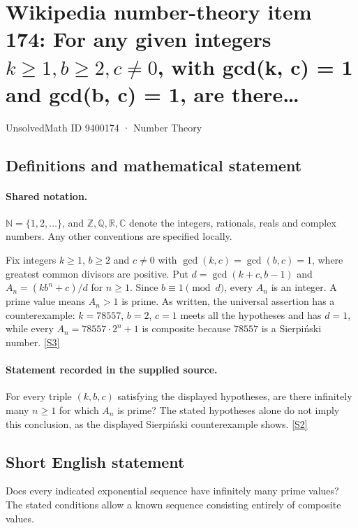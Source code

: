 \documentclass[11pt]{article}
\newcommand{\sref}[2]{\hyperlink{source:#1:#2}{[S#2]}}
\begin{document}
\setcounter{section}{9400173}
\section{\texorpdfstring{Wikipedia number-theory item 174: For any given integers $k\geq 1, b\geq 2, c\neq 0$, with gcd(k, c) = 1 and gcd(b, c) = 1, are there…}{Wikipedia number-theory item 174: For any given integers k>= 1, b>= 2, cneq 0, with gcd(k, c) = 1 and gcd(b, c) = 1, are there…}}\label{9400174}
{\small\sffamily UnsolvedMath ID 9400174 · Number Theory}
\subsection{Definitions and mathematical statement}

\paragraph{Shared notation.}$\mathbb N=\{1,2,\ldots\}$, and $\mathbb Z,\mathbb Q,\mathbb R,\mathbb C$ denote the integers, rationals, reals and complex numbers. Any other conventions are specified locally.


Fix integers $k\ge1$, $b\ge2$ and $c\ne0$ with $\gcd(k,c)=\gcd(b,c)=1$, where greatest common divisors are positive. Put $d=\gcd(k+c,b-1)$ and $A_n=(kb^n+c)/d$ for $n\ge1$. Since $b\equiv1\pmod d$, every $A_n$ is an integer. A prime value means $A_n>1$ is prime. As written, the universal assertion has a counterexample: $k=78557$, $b=2$, $c=1$ meets all the hypotheses and has $d=1$, while every $A_n=78557\cdot2^n+1$ is composite because $78557$ is a Sierpi\'nski number. \sref{9400174}{3}
\paragraph{Statement recorded in the supplied source.}
For every triple $(k,b,c)$ satisfying the displayed hypotheses, are there infinitely many $n\ge1$ for which $A_n$ is prime? The stated hypotheses alone do not imply this conclusion, as the displayed Sierpi\'nski counterexample shows. \sref{9400174}{2}
\subsection{Short English statement}
Does every indicated exponential sequence have infinitely many prime values? The stated conditions allow a known sequence consisting entirely of composite values.
\end{document}
